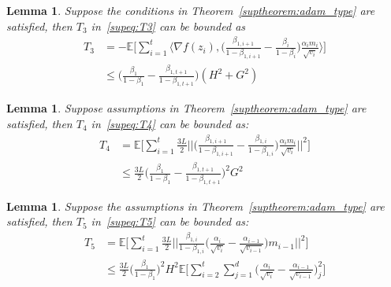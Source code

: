 \documentclass{article}
\newtheorem{lemma}[theorem]{Lemma}
\begin{document}
\begin{lemma} \cite{chen2018convergence}
\label{suplemma:6.4}
Suppose the conditions in Theorem~\ref{suptheorem:adam_type} are satisfied, then $T_3$ in~\eqref{supeq:T3} can be bounded as
\begin{align}
\label{supeq:T3_bound}
T_3 &= - \mathbb{E} \Big[ \sum_{i=1}^t \langle \nabla f(z_i), \Big( \frac{\beta_{1,i+1}}{1 - \beta_{1,i+1}} - \frac{\beta_i}{1-\beta_i} \Big) \frac{\alpha_i m_i}{\sqrt{v_i}} \rangle  \Big] \nonumber \\
& \leq \Big( \frac{\beta_1}{1-\beta_1} - \frac{\beta_{1,t+1}}{1-\beta_{1,t+1}}\Big) (H^2+G^2)
\end{align}
\end{lemma}

\begin{lemma} \cite{chen2018convergence}
\label{suplemma:6.5}
Suppose assumptions in Theorem~\ref{suptheorem:adam_type} are satisfied, then $T_4$ in~\eqref{supeq:T4} can be bounded as:
\begin{align}
\label{supeq:T4_bound}
T_4 &= \mathbb{E} \Big[ \sum_{i=1}^t \frac{3L}{2} \Big \vert \Big \vert \Big( \frac{\beta_{1,i+1}}{1-\beta_{1,i+1}} - \frac{\beta_{1,i}}{1-\beta_{1,i}} \Big) \frac{\alpha_i m_i}{ \sqrt{v_i}} \Big \vert \Big \vert^2 \Big] \nonumber \\
& \leq \frac{3L}{2}\Big( \frac{\beta_1}{1-\beta_1} - \frac{\beta_{1,t+1}}{1-\beta_{1,t+1}} \Big)^2G^2
\end{align}
\end{lemma}

\begin{lemma} \cite{chen2018convergence}
\label{suplemma:6.6}
Suppose the assumptions in Theorem~\ref{suptheorem:adam_type} are satisfied, then $T_5$ in~\eqref{supeq:T5} can be bounded as:
\begin{align}
\label{supeq:T5_bound}
T_5 &= \mathbb{E} \Big[ \sum_{i=1}^t \frac{3L}{2} \Big \vert \Big \vert \frac{\beta_{1,i}}{1-\beta_{1,i}} \Big( \frac{\alpha_i}{\sqrt{v_i}} - \frac{\alpha_{i-1}}{\sqrt{v_{i-1}}} \Big)m_{i-1} \Big \vert \Big \vert^2  \Big] \nonumber \\
& \leq \frac{3L}{2} \Big( \frac{\beta_1}{1-\beta_1} \Big)^2 H^2 \mathbb{E} \Bigg[ \sum_{i=2}^t \sum_{j=1}^d \Big( \frac{\alpha_i}{\sqrt{v_i}} - \frac{\alpha_{i-1}}{\sqrt{v_{i-1}}} \Big)^2_j \Bigg]
\end{align}
\end{lemma}
\end{document}
